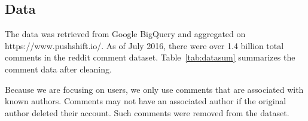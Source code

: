 \documentclass[letterpaper]{article}
\newcommand{\del}[1]{{\textcolor{gray}{#1}}}
\begin{document}
\subsection{Data}
The data was retrieved from Google BigQuery and aggregated on https://www.pushshift.io/. %
As of July 2016, there were over 1.4 billion total comments in the reddit comment dataset.
Table~\ref{tab:datasum} summarizes the comment data after cleaning.


\begin{table}[htb]
    \centering
    \caption{Reddit Commment Data Summary                      }
    \label{tab:datasum}
\end{table}
 
Because we are focusing on users, we only use comments that are associated with known authors. Comments may not have an associated author if the original author deleted their account. Such comments were removed from the dataset.


\end{document}
